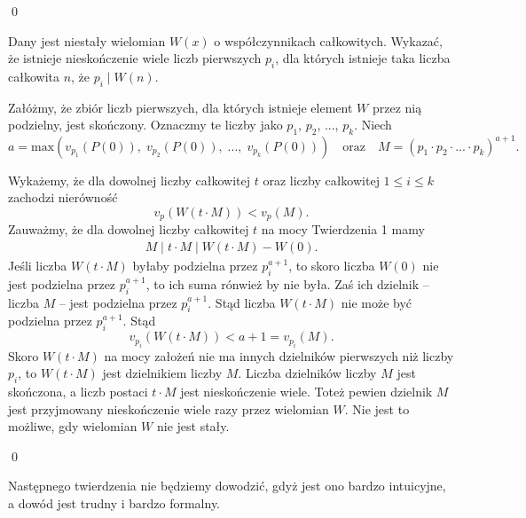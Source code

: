 \qed


\noindent
Dany jest niestały wielomian $W(x)$ o współczynnikach całkowitych. Wykazać, że istnieje nieskończenie wiele liczb pierwszych $p_i$, dla których istnieje taka liczba całkowita $n$, że $p_i \mid W(n)$.

\vspace{5px}


\noindent
Załóżmy, że zbiór liczb pierwszych, dla których istnieje element $W$ przez nią podzielny, jest skończony. Oznaczmy te liczby jako $p_1$, $p_2$, ..., $p_k$.  Niech 
\[
	a = \text{max}(v_{p_1}(P(0)),\; v_{p_2}(P(0)),\; ...,\; v_{p_k}(P(0))) \quad \text{oraz} \quad M = (p_1 \cdot p_2 \cdot ... \cdot p_k)^{a + 1}.
\]

\vspace{10px}
\noindent
Wykażemy, że dla dowolnej liczby całkowitej $t$ oraz liczby całkowitej $1 \leqslant i \leqslant k$ zachodzi nierówność
\[
	v_p(W(t \cdot M)) < v_p(M).
\]
Zauważmy, że dla dowolnej liczby całkowitej $t$ na mocy Twierdzenia 1 mamy
\begin{align*}
	M \mid t \cdot M \mid W(t \cdot M) - W(0).
\end{align*}
Jeśli liczba $W(t \cdot M)$ byłaby podzielna przez $p_i^{a + 1}$, to skoro liczba $W(0)$ nie jest podzielna przez $p_i^{a + 1}$, to ich suma rónwież by nie była. Zaś ich dzielnik -- liczba $M$ -- jest podzielna przez $p_i^{a + 1}$. Stąd liczba $W(t \cdot M)$ nie może być podzielna przez $p_i^{a + 1}$. Stąd
\[
	v_{p_i}(W(t\cdot M)) < a + 1 = v_{p_i}(M).
\] 
Skoro $W(t\cdot M)$ na mocy założeń nie ma innych dzielników pierwszych niż liczby $p_i$, to $W(t\cdot M)$ jest dzielnikiem liczby $M$. Liczba dzielników liczby $M$ jest skończona, a liczb postaci $t\cdot M$ jest nieskończenie wiele. Toteż pewien dzielnik $M$ jest przyjmowany nieskończenie wiele razy przez wielomian $W$. Nie jest to możliwe, gdy wielomian $W$ nie jest stały.

\qed

\noindent
Następnego twierdzenia nie będziemy dowodzić, gdyż jest ono bardzo intuicyjne, a dowód jest trudny i bardzo formalny.

\vspace{5px}

